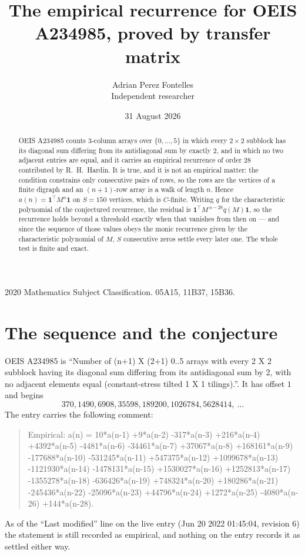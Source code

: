 \documentclass[11pt,a4paper]{article}
\title{The empirical recurrence for OEIS A234985, proved by transfer matrix}
\author{Adrian Perez Fontelles\\ \small Independent researcher}
\date{31 August 2026}
\theoremstyle{plain}
\theoremstyle{definition}
\begin{document}
\maketitle

\begin{abstract}
OEIS A234985 counts $3$-column arrays over $\{0,\dots,5\}$ in which every
$2\times2$ subblock has its diagonal sum differing from its antidiagonal sum by
exactly $2$, and in which no two adjacent entries are equal, and it
carries an empirical recurrence of order $28$ contributed by R.~H.~Hardin. It is true,
and it is not an empirical matter: the condition constrains only consecutive pairs of rows,
so the rows are the vertices of a finite digraph and an $(n+1)$-row array is a walk of
length $n$. Hence $a(n)=\mathbf{1}^{\!\top}M^{n}\mathbf{1}$ on $S=150$ vertices, which
is $C$-finite. Writing $q$ for the characteristic polynomial of the conjectured recurrence,
the residual is $\mathbf{1}^{\!\top}M^{\,n-28}q(M)\mathbf{1}$, so the recurrence
holds beyond a threshold exactly when that vanishes from then on --- and since the sequence
of those values obeys the monic recurrence given by the characteristic polynomial of $M$,
$S$ consecutive zeros settle every later one. The whole test is finite and exact.
\end{abstract}

\noindent\small 2020 Mathematics Subject Classification. 05A15, 11B37, 15B36.\normalsize

\section{The sequence and the conjecture}

OEIS A234985 is ``Number of (n+1) X (2+1) 0..5 arrays with every 2 X 2 subblock having its diagonal sum differing from its antidiagonal sum by 2, with no adjacent elements equal (constant-stress tilted 1 X 1 tilings).''. It has offset
$1$ and begins
\[
370, 1490, 6908, 35598, 189200, 1026784, 5628414,\ \dots
\]
The entry carries the following comment:
\begin{quote}\small
Empirical: a(n) = 10*a(n-1) +9*a(n-2) -317*a(n-3) +216*a(n-4) +4392*a(n-5) -4481*a(n-6) -34461*a(n-7) +37067*a(n-8) +168161*a(n-9) -177688*a(n-10) -531245*a(n-11) +547375*a(n-12) +1099678*a(n-13) -1121930*a(n-14) -1478131*a(n-15) +1530027*a(n-16) +1252813*a(n-17) -1355278*a(n-18) -636426*a(n-19) +748324*a(n-20) +180286*a(n-21) -245436*a(n-22) -25096*a(n-23) +44796*a(n-24) +1272*a(n-25) -4080*a(n-26) +144*a(n-28).
\end{quote}
As of the ``Last modified'' line on the live entry (Jun 20 2022 01:45:04, revision 6) the statement is
still recorded as empirical, and nothing on the entry records it as settled either way.
\end{document}
